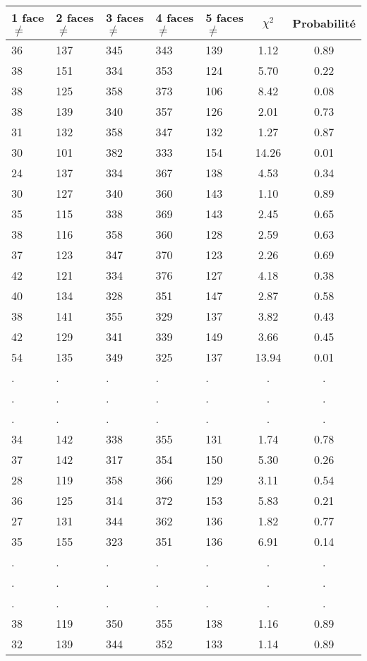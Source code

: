\documentclass[12pt,a4paper]{article}
\begin{document}
\begin{center}
\begin{tabular}{|l|l|l|l|l|c|c|}
\hline
1 face $\neq$ & 2 faces $\neq$  & 3 faces $\neq$ & 4 faces $\neq$ & 5 faces $\neq$ & $\chi^2$ & Probabilité \\
\hline \hline
36 & 137 & 345 & 343 & 139 &  1.12 &  0.89\\ \hline
38 & 151 & 334 & 353 & 124 &  5.70 &  0.22\\ \hline
38 & 125 & 358 & 373 & 106 &  8.42 &  0.08\\ \hline
38 & 139 & 340 & 357 & 126 &  2.01 &  0.73\\ \hline
31 & 132 & 358 & 347 & 132 &  1.27 &  0.87\\ \hline
30 & 101 & 382 & 333 & 154 & 14.26 &  0.01\\ \hline
24 & 137 & 334 & 367 & 138 &  4.53 &  0.34\\ \hline
30 & 127 & 340 & 360 & 143 &  1.10 &  0.89\\ \hline
35 & 115 & 338 & 369 & 143 &  2.45 &  0.65\\ \hline
38 & 116 & 358 & 360 & 128 &  2.59 &  0.63\\ \hline
37 & 123 & 347 & 370 & 123 &  2.26 &  0.69\\ \hline
42 & 121 & 334 & 376 & 127 &  4.18 &  0.38\\ \hline
40 & 134 & 328 & 351 & 147 &  2.87 &  0.58\\ \hline
38 & 141 & 355 & 329 & 137 &  3.82 &  0.43\\ \hline
42 & 129 & 341 & 339 & 149 &  3.66 &  0.45\\ \hline
54 & 135 & 349 & 325 & 137 & 13.94 &  0.01\\ \hline
 . & . & . & . & . & . & . \\ \hline
 . & . & . & . & . & . & . \\ \hline
 . & . & . & . & . & . & . \\ \hline
34 & 142 & 338 & 355 & 131 &  1.74 &  0.78\\ \hline
37 & 142 & 317 & 354 & 150 &  5.30 &  0.26\\ \hline
28 & 119 & 358 & 366 & 129 &  3.11 &  0.54\\ \hline
36 & 125 & 314 & 372 & 153 &  5.83 &  0.21\\ \hline
27 & 131 & 344 & 362 & 136 &  1.82 &  0.77\\ \hline
35 & 155 & 323 & 351 & 136 &  6.91 &  0.14\\ \hline
 . & . & . & . & . & . & . \\ \hline
 . & . & . & . & . & . & . \\ \hline
 . & . & . & . & . & . & . \\ \hline
38 & 119 & 350 & 355 & 138 &  1.16 &  0.89\\ \hline
32 & 139 & 344 & 352 & 133 &  1.14 &  0.89\\ \hline
\end{tabular}
\end{center}
\end{document}
